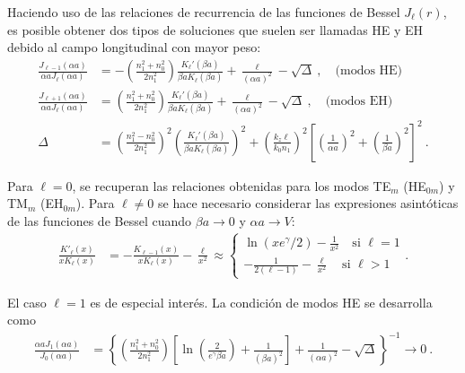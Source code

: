 Haciendo uso de las relaciones de recurrencia de las funciones de Bessel $J_\ell(r)$,  es posible obtener dos tipos de soluciones que suelen ser llamadas HE y EH debido al campo longitudinal con mayor peso:
\begin{align}
		\frac{J_{\ell-1}(\alpha a)}{\alpha a J_\ell(\alpha a)} &= -\left(\frac{n_1^2+n_0^2}{2n_1^2}\right) \frac{K_\ell'(\beta a)}{\beta a K_\ell(\beta a)}+\frac{\ell}{(\alpha a)^2}-\sqrt{\Delta} \ , \quad \text{(modos HE)}
		\label{eqn:HE}
	\\
		\frac{J_{\ell+1}(\alpha a)}{\alpha a J_\ell(\alpha a)} &= \left(\frac{n_1^2+n_0^2}{2n_1^2}\right) \frac{K_\ell'(\beta a)}{\beta a K_\ell(\beta a)}+\frac{\ell}{(\alpha a)^2}-\sqrt{\Delta} \ , \quad \text{(modos EH)}
		\label{eqn:EH}
		\\
		\Delta &= \left(\frac{n_1^2-n_0^2}{2n_1^2}\right)^2\left(\frac{K_\ell'(\beta a)}{\beta a K_\ell(\beta a)}\right)^2+ \left( \frac{ k_z \ell}{ k_0 n_1} \right)^2\left[ \left(\frac{1}{\alpha a}\right)^2 + \left(\frac{1}{\beta a}\right)^2 \right]^2 \ . \nonumber
\end{align}

Para $\ell = 0$, se recuperan las relaciones obtenidas para los modos  TE$_m$ (HE$_{0m}$) y TM$_m$ (EH$_{0m}$). Para $\ell \neq 0$ se hace necesario considerar las expresiones asintóticas de las funciones de Bessel cuando $\beta a \to 0$ y $\alpha a \to V$:
\begin{align*}
	\frac{K'_\ell (x)}{xK_\ell (x)} &= -\frac{K_{\ell-1} (x)}{xK_\ell (x)}-\frac{\ell}{x^2}\approx \left\{\begin{matrix}
	\ln(xe^\gamma/2)-\frac{1}{x^2} \quad\text{si }\ell = 1
	\\
	-\frac{
	1}{2(\ell-1)}-\frac{\ell}{x^2}\quad \text{si }\ell > 1
	\end{matrix}\right. .
\end{align*}


El caso $\ell=1$ es de especial interés. La condición de modos HE se desarrolla como
\begin{align*}
	\frac{\alpha a J_1(\alpha a)}{J_0(\alpha a)} &= \left\{\left(\frac{n_1^2+n_0^2}{2n_1^2}\right) \left[ \ln\left(\frac{2}{e^\gamma \beta a}\right)+\frac{1}{(\beta a)^2} \right]+\frac{1}{(\alpha a)^2}-\sqrt{\Delta}\right\}^{-1} \to 0 \ .
\end{align*}

